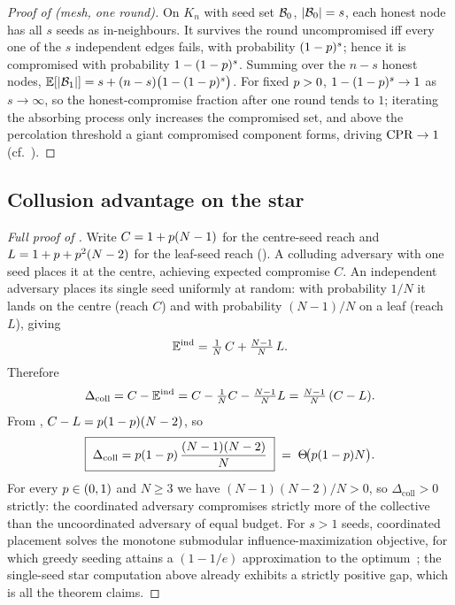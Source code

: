 \begin{proof}[Proof of  (mesh, one round)]
On $K_n$ with seed set $\mathcal{B}_0$, $|\mathcal{B}_0|=s$, each honest node has all $s$ seeds as
in-neighbours. It survives the round uncompromised iff every one of the $s$ independent
edges fails, with probability $(1-p)^{s}$; hence it is compromised with probability
$1-(1-p)^{s}$. Summing over the $n-s$ honest nodes,
$\mathbb{E}[|\mathcal{B}_1|]=s+(n-s)\bigl(1-(1-p)^{s}\bigr)$. For fixed $p>0$,
$1-(1-p)^{s}\to1$ as $s\to\infty$, so the honest-compromise fraction after one round
tends to $1$; iterating the absorbing process only increases the compromised set, and above
the percolation threshold a giant compromised component forms, driving $\mathrm{CPR}\to1$
(cf.~\cite{kempe2003maximizing,watts2002simple}).
\end{proof}

\subsection{Collusion advantage on the star}

\begin{proof}[Full proof of ]
Write $C=1+p(N-1)$ for the centre-seed reach and $L=1+p+p^{2}(N-2)$ for the
leaf-seed reach (). A colluding adversary with one seed places it at the
centre, achieving expected compromise $C$. An independent adversary places its single seed
uniformly at random: with probability $1/N$ it lands on the centre (reach $C$) and with
probability $(N-1)/N$ on a leaf (reach $L$), giving
\[
\mathbb{E}^{\mathrm{ind}}=\tfrac1N\,C+\tfrac{N-1}{N}\,L.
\]
Therefore
\[
\Delta_{\mathrm{coll}}=C-\mathbb{E}^{\mathrm{ind}}
=C-\tfrac1N C-\tfrac{N-1}{N}L
=\tfrac{N-1}{N}\,(C-L).
\]
From , $C-L=p(1-p)(N-2)$, so
\[
\boxed{\;\Delta_{\mathrm{coll}}=p(1-p)\,\frac{(N-1)(N-2)}{N}\;}
\;=\;\Theta\!\bigl(p(1-p)N\bigr).
\]
For every $p\in(0,1)$ and $N\ge3$ we have $(N-1)(N-2)/N>0$, so $\Delta_{\mathrm{coll}}>0$
strictly: the coordinated adversary compromises strictly more of the collective than the
uncoordinated adversary of equal budget. For $s>1$ seeds, coordinated placement solves the
monotone submodular influence-maximization objective, for which greedy seeding attains a
$(1-1/e)$ approximation to the optimum~\cite{kempe2003maximizing}; the single-seed star
computation above already exhibits a strictly positive gap, which is all the theorem claims.
\end{proof}

